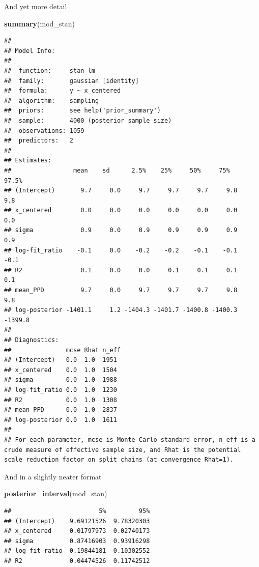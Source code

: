 \documentclass[ignorenonframetext,]{beamer}
\newenvironment{Shaded}{\begin{snugshade}}{\end{snugshade}}
\newcommand{\KeywordTok}[1]{\textcolor[rgb]{0.13,0.29,0.53}{\textbf{#1}}}
\newcommand{\NormalTok}[1]{#1}
\begin{document}
\begin{frame}[fragile]{And yet more detail}

\tiny

\begin{Shaded}
\begin{Highlighting}[]
\KeywordTok{summary}\NormalTok{(mod_stan)}
\end{Highlighting}
\end{Shaded}

\begin{verbatim}
## 
## Model Info:
## 
##  function:     stan_lm
##  family:       gaussian [identity]
##  formula:      y ~ x_centered
##  algorithm:    sampling
##  priors:       see help('prior_summary')
##  sample:       4000 (posterior sample size)
##  observations: 1059
##  predictors:   2
## 
## Estimates:
##                 mean    sd      2.5%    25%     50%     75%     97.5%
## (Intercept)       9.7     0.0     9.7     9.7     9.7     9.8     9.8
## x_centered        0.0     0.0     0.0     0.0     0.0     0.0     0.0
## sigma             0.9     0.0     0.9     0.9     0.9     0.9     0.9
## log-fit_ratio    -0.1     0.0    -0.2    -0.2    -0.1    -0.1    -0.1
## R2                0.1     0.0     0.0     0.1     0.1     0.1     0.1
## mean_PPD          9.7     0.0     9.7     9.7     9.7     9.8     9.8
## log-posterior -1401.1     1.2 -1404.3 -1401.7 -1400.8 -1400.3 -1399.8
## 
## Diagnostics:
##               mcse Rhat n_eff
## (Intercept)   0.0  1.0  1951 
## x_centered    0.0  1.0  1504 
## sigma         0.0  1.0  1988 
## log-fit_ratio 0.0  1.0  1230 
## R2            0.0  1.0  1308 
## mean_PPD      0.0  1.0  2837 
## log-posterior 0.0  1.0  1611 
## 
## For each parameter, mcse is Monte Carlo standard error, n_eff is a crude measure of effective sample size, and Rhat is the potential scale reduction factor on split chains (at convergence Rhat=1).
\end{verbatim}

\end{frame}

\begin{frame}[fragile]{And in a slightly neater format}

\begin{Shaded}
\begin{Highlighting}[]
\KeywordTok{posterior_interval}\NormalTok{(mod_stan)}
\end{Highlighting}
\end{Shaded}

\begin{verbatim}
##                        5%         95%
## (Intercept)    9.69121526  9.78320303
## x_centered     0.01797973  0.02740173
## sigma          0.87416903  0.93916298
## log-fit_ratio -0.19844181 -0.10302552
## R2             0.04474526  0.11742512
\end{verbatim}

\end{frame}
\end{document}
